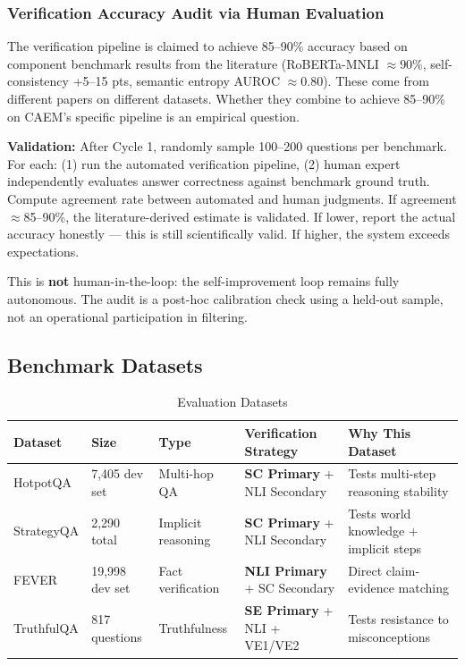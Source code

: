 \documentclass[12pt,a4paper]{article}
\theoremstyle{definition}
\begin{document}
\subsubsection{Verification Accuracy Audit via Human Evaluation}

The verification pipeline is claimed to achieve 85--90\% accuracy based on component benchmark results from the literature (RoBERTa-MNLI $\approx$90\%, self-consistency +5--15 pts, semantic entropy AUROC $\approx$0.80). These come from different papers on different datasets. Whether they combine to achieve 85--90\% on CAEM's specific pipeline is an empirical question.

\textbf{Validation:} After Cycle 1, randomly sample 100--200 questions per benchmark. For each: (1) run the automated verification pipeline, (2) human expert independently evaluates answer correctness against benchmark ground truth. Compute agreement rate between automated and human judgments. If agreement $\approx$85--90\%, the literature-derived estimate is validated. If lower, report the actual accuracy honestly — this is still scientifically valid. If higher, the system exceeds expectations.

This is \textbf{not} human-in-the-loop: the self-improvement loop remains fully autonomous. The audit is a post-hoc calibration check using a held-out sample, not an operational participation in filtering.

\subsection{Benchmark Datasets}

\begin{table}[htbp]
\centering
\caption{Evaluation Datasets}
\small
\begin{tabular}{lp{2.5cm}p{2cm}p{2.5cm}p{2.5cm}}
\toprule
\textbf{Dataset} & \textbf{Size} & \textbf{Type} & \textbf{Verification Strategy} & \textbf{Why This Dataset} \\
\midrule
HotpotQA & 7,405 dev set & Multi-hop QA & \textbf{SC Primary} + NLI Secondary & Tests multi-step reasoning stability \\
\midrule
StrategyQA & 2,290 total & Implicit reasoning & \textbf{SC Primary} + NLI Secondary & Tests world knowledge + implicit steps \\
\midrule
FEVER & 19,998 dev set & Fact verification & \textbf{NLI Primary} + SC Secondary & Direct claim-evidence matching \\
\midrule
TruthfulQA & 817 questions & Truthfulness & \textbf{SE Primary} + NLI + VE1/VE2 & Tests resistance to misconceptions \\
\bottomrule
\end{tabular}
\end{table}
\end{document}
